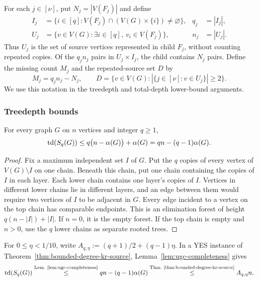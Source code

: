 For each $j\in[\nu]$, put $N_j=|V(F_j)|$ and define
\[
\begin{aligned}
 I_j&=\{i\in[q]:V(F_j)\cap(V(G)\times\{i\})\ne\varnothing\},
 &q_j&=|I_j|,\\
 U_j&=\{v\in V(G):\exists i\in[q],\ v_i\in V(F_j)\},
 &n_j&=|U_j|.
\end{aligned}
\]
Thus $U_j$ is the set of source vertices represented in child
$F_j$, without counting repeated copies. Of the $q_jn_j$ pairs in
$U_j\times I_j$, the child contains $N_j$ pairs. Define the missing count
$M_j$ and the repeated-source set $D$ by
\[
 M_j=q_jn_j-N_j,\qquad D=\{v\in V(G):|\{j\in[\nu]:v\in U_j\}|\geq2\}.
\]
We use this notation in the treedepth and total-depth lower-bound
arguments.

\subsubsection{Treedepth bounds}

\begin{lemma}\label{lem:ugc-completeness}
For every graph $G$ on $n$ vertices and integer $q\geq1$,
\[
  \operatorname{td}(S_q(G))\leq q\bigl(n-\alpha(G)\bigr)+\alpha(G)
  =qn-(q-1)\alpha(G).
\]
\end{lemma}

\begin{proof}
Fix a maximum independent set $I$ of $G$. Put the $q$ copies of every
vertex of $V(G)\setminus I$ on one chain. Beneath this chain, put one
chain containing the copies of $I$ in each layer. Each lower chain
contains one layer's copies of $I$. Vertices in different lower chains
lie in different layers, and an edge between them would require two
vertices of $I$ to be adjacent in $G$. Every edge incident to a vertex on the top chain
has comparable endpoints. This is an elimination forest of height
$q(n-|I|)+|I|$. If $n=0$, it is the empty forest. If the top chain
is empty and $n>0$, use the $q$ lower chains as separate rooted trees.
\end{proof}

For $0\leq\eta<1/10$, write $A_{q,\eta}:=(q+1)/2+(q-1)\eta$.
In a YES instance of
Theorem~\ref{thm:bounded-degree-kr-source}, Lemma~\ref{lem:ugc-completeness} gives
\begin{equation}\label{eq:ugc-yes}
 \operatorname{td}(S_q(G))
 \overset{\text{Lem.~\ref{lem:ugc-completeness}}}{\leq}
 qn-(q-1)\alpha(G)
 \overset{\text{Thm.~\ref{thm:bounded-degree-kr-source}}}{\leq}
 A_{q,\eta}n.
\end{equation}

